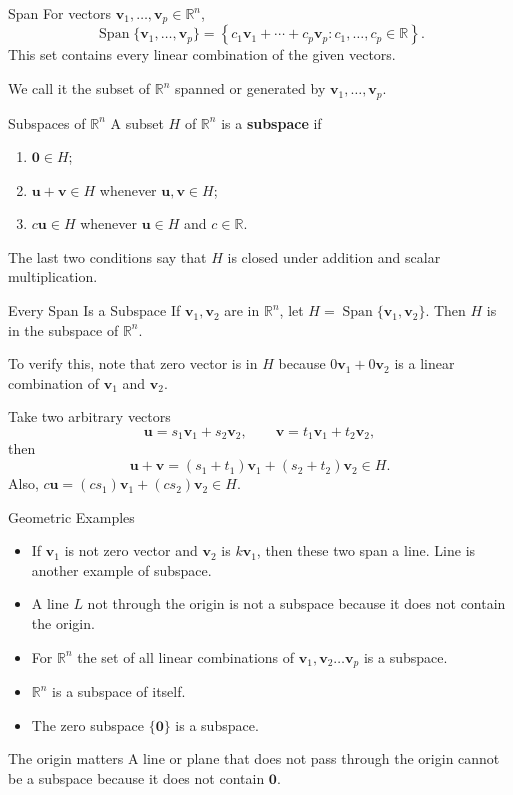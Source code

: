 \documentclass[aspectratio=169]{beamer}
\newcommand{\R}{\mathbb{R}}
\newcommand{\vect}[1]{\mathbf{#1}}
\newcommand{\Span}{\operatorname{Span}}
\begin{document}
\begin{frame}{Span}
For vectors $\vect v_1,\ldots,\vect v_p\in\R^n$,
\[
\Span\{\vect v_1,\ldots,\vect v_p\}
=\left\{c_1\vect v_1+\cdots+c_p\vect v_p:c_1,\ldots,c_p\in\R\right\}.
\]
This set contains every linear combination of the given vectors.
\pause

We call it the subset of $\R^n$ spanned or generated by $\vect v_1,\ldots,\vect v_p$.
\end{frame}

\begin{frame}{Subspaces of \texorpdfstring{$\R^n$}{R^n}}
A subset $H$ of $\R^n$ is a \textbf{subspace} if
\begin{enumerate}
  \item $\vect0\in H$;
  \item $\vect u+\vect v\in H$ whenever $\vect u,\vect v\in H$;
  \item $c\vect u\in H$ whenever $\vect u\in H$ and $c\in\R$.
\end{enumerate}
\pause
The last two conditions say that $H$ is closed under addition and scalar multiplication.
\end{frame}

\begin{frame}{Every Span Is a Subspace}
If $\vect v_1, \vect v_2$ are in $\mathbb{R}^n$, let $H=\Span\{\vect v_1,\vect v_2\}$. Then $H$ is in the subspace of $\mathbb{R}^n$.

To verify this, note that zero vector is in $H$ because $0 \vect v_1 + 0 \vect v_2 $ is a linear combination of $\vect v_1$ and $\vect v_2$.

Take two arbitrary vectors
\[
\vect u=s_1\vect v_1+s_2\vect v_2,
\qquad
\vect v=t_1\vect v_1+t_2\vect v_2,
\]
then
\[
\vect u+\vect v=(s_1+t_1)\vect v_1+(s_2+t_2)\vect v_2\in H.
\]
Also, $c\vect u=(cs_1)\vect v_1+(cs_2)\vect v_2\in H$.
\end{frame}

\begin{frame}{Geometric Examples}
\begin{itemize}
  \item If $\vect v_1$ is not zero vector and $\vect v_2$ is $k \vect v_1$, then these two span a line. Line is another example of subspace.
  \item A line $L$ not through the origin is not a subspace because it does not contain the origin.
  \item For $\mathbb{R}^n$ the set of all linear combinations of $\vect v_1, \vect v_2 \dots \vect v_p$ is a subspace.
  \item $\R^n$ is a subspace of itself.
  \item The zero subspace $\{\vect0\}$ is a subspace.
\end{itemize}
\pause
\begin{alertblock}{The origin matters}
A line or plane that does not pass through the origin cannot be a subspace because it does not contain $\vect0$.
\end{alertblock}
\end{frame}
\end{document}
